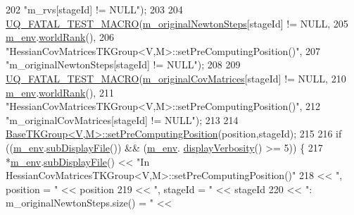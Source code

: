 \begin{DoxyCode}
202                       \textcolor{stringliteral}{"m\_rvs[stageId] != NULL"});
203 
204   \hyperlink{_defines_8h_a56d63d18d0a6d45757de47fcc06f574d}{UQ\_FATAL\_TEST\_MACRO}(\hyperlink{class_q_u_e_s_o_1_1_hessian_cov_matrices_t_k_group_a4c0fe3171a35cdd453a4e23e1438ddf9}{m\_originalNewtonSteps}[stageId] != NULL,
205                       \hyperlink{class_q_u_e_s_o_1_1_base_t_k_group_a2bce5e8aa5c844d4332a0e73cf00a1f9}{m\_env}.\hyperlink{class_q_u_e_s_o_1_1_base_environment_a78b57112bbd0e6dd0e8afec00b40ffa7}{worldRank}(),
206                       \textcolor{stringliteral}{"HessianCovMatricesTKGroup<V,M>::setPreComputingPosition()"},
207                       \textcolor{stringliteral}{"m\_originalNewtonSteps[stageId] != NULL"});
208 
209   \hyperlink{_defines_8h_a56d63d18d0a6d45757de47fcc06f574d}{UQ\_FATAL\_TEST\_MACRO}(\hyperlink{class_q_u_e_s_o_1_1_hessian_cov_matrices_t_k_group_acc7219917faf933e77694894856fa646}{m\_originalCovMatrices}[stageId] != NULL,
210                       \hyperlink{class_q_u_e_s_o_1_1_base_t_k_group_a2bce5e8aa5c844d4332a0e73cf00a1f9}{m\_env}.\hyperlink{class_q_u_e_s_o_1_1_base_environment_a78b57112bbd0e6dd0e8afec00b40ffa7}{worldRank}(),
211                       \textcolor{stringliteral}{"HessianCovMatricesTKGroup<V,M>::setPreComputingPosition()"},
212                       \textcolor{stringliteral}{"m\_originalCovMatrices[stageId] != NULL"});
213 
214   \hyperlink{class_q_u_e_s_o_1_1_base_t_k_group_acd1efb5b2ae3eb4f1130fa37201545d8}{BaseTKGroup<V,M>::setPreComputingPosition}(position,stageId);
215 
216   \textcolor{keywordflow}{if} ((\hyperlink{class_q_u_e_s_o_1_1_base_t_k_group_a2bce5e8aa5c844d4332a0e73cf00a1f9}{m\_env}.\hyperlink{class_q_u_e_s_o_1_1_base_environment_a8a0064746ae8dddfece4229b9ad374d6}{subDisplayFile}()) && (\hyperlink{class_q_u_e_s_o_1_1_base_t_k_group_a2bce5e8aa5c844d4332a0e73cf00a1f9}{m\_env}.
      \hyperlink{class_q_u_e_s_o_1_1_base_environment_a1fe5f244fc0316a0ab3e37463f108b96}{displayVerbosity}() >= 5)) \{
217     *\hyperlink{class_q_u_e_s_o_1_1_base_t_k_group_a2bce5e8aa5c844d4332a0e73cf00a1f9}{m\_env}.\hyperlink{class_q_u_e_s_o_1_1_base_environment_a8a0064746ae8dddfece4229b9ad374d6}{subDisplayFile}() << \textcolor{stringliteral}{"In
       HessianCovMatricesTKGroup<V,M>::setPreComputingPosition()"}
218                            << \textcolor{stringliteral}{", position = "}                          << position
219                            << \textcolor{stringliteral}{", stageId = "}                           << stageId
220                            << \textcolor{stringliteral}{": m\_originalNewtonSteps.size() = "}      << 

\end{DoxyCode}
